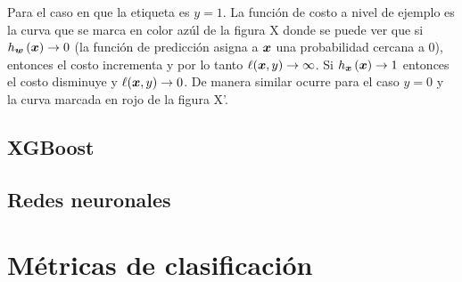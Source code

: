 Para el caso en que la etiqueta es $y = 1$. La función de costo a nivel de
ejemplo es la curva que se marca en color azúl de la figura X donde se puede ver
que si $h_{\boldsymbol{w}}\left( \boldsymbol{x} \right) \rightarrow 0$ (la función de
predicción asigna a $\boldsymbol{x}$ una probabilidad cercana a $0$), entonces el
costo incrementa y por lo tanto $\ell(\boldsymbol{x}, y) \rightarrow \infty$. Si
$h_{\boldsymbol{x}}\left( \boldsymbol{x} \right) \rightarrow 1$ entonces el costo disminuye
y $\ell(\boldsymbol{x}, y) \rightarrow 0$. De manera similar ocurre para el caso $y =
0$ y la curva marcada en rojo de la figura X'.



\subsection{XGBoost}

\subsection{Redes neuronales}

\section{Métricas de clasificación}